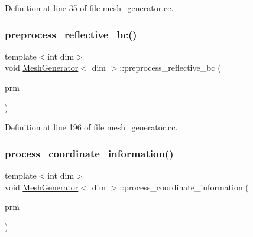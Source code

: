 Definition at line 35 of file mesh\+\_\+generator.\+cc.

\mbox{\label{class_mesh_generator_a93d10aa06b5b638a859e2fc53dbea5e0}} 
\subsubsection{\texorpdfstring{preprocess\+\_\+reflective\+\_\+bc()}{preprocess\_reflective\_bc()}}
{\footnotesize\ttfamily template$<$int dim$>$ \\
void \hyperlink{class_mesh_generator}{Mesh\+Generator}$<$ dim $>$\+::preprocess\+\_\+reflective\+\_\+bc (\begin{DoxyParamCaption}\item[{Parameter\+Handler \&}]{prm }\end{DoxyParamCaption})\hspace{0.3cm}{\ttfamily [private]}}



Definition at line 196 of file mesh\+\_\+generator.\+cc.

\mbox{\label{class_mesh_generator_a253330ef901e2a915576f6d6cd4262b5}} 
\subsubsection{\texorpdfstring{process\+\_\+coordinate\+\_\+information()}{process\_coordinate\_information()}}
{\footnotesize\ttfamily template$<$int dim$>$ \\
void \hyperlink{class_mesh_generator}{Mesh\+Generator}$<$ dim $>$\+::process\+\_\+coordinate\+\_\+information (\begin{DoxyParamCaption}\item[{Parameter\+Handler \&}]{prm }\end{DoxyParamCaption})\hspace{0.3cm}{\ttfamily [private]}}



